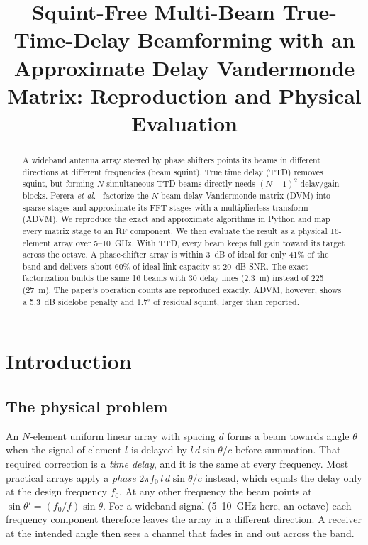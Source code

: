 \documentclass[conference]{IEEEtran}
\begin{document}
\title{Squint-Free Multi-Beam True-Time-Delay Beamforming with an Approximate Delay Vandermonde Matrix: Reproduction and Physical Evaluation}

\author{
}

\maketitle

\begin{abstract}
A wideband antenna array steered by phase shifters points its beams in different directions at different frequencies (beam squint). True time delay (TTD) removes squint, but forming $N$ simultaneous TTD beams directly needs $(N-1)^2$ delay/gain blocks. Perera \emph{et al.}~\cite{perera2025} factorize the $N$-beam delay Vandermonde matrix (DVM) into sparse stages and approximate its FFT stages with a multiplierless transform (ADVM). We reproduce the exact and approximate algorithms in Python and map every matrix stage to an RF component. We then evaluate the result as a physical 16-element array over 5--10~GHz. With TTD, every beam keeps full gain toward its target across the octave. A phase-shifter array is within 3~dB of ideal for only 41\% of the band and delivers about 60\% of ideal link capacity at 20~dB SNR. The exact factorization builds the same 16 beams with 30 delay lines (2.3~m) instead of 225 (27~m). The paper's operation counts are reproduced exactly. ADVM, however, shows a 5.3~dB sidelobe penalty and $1.7^\circ$ of residual squint, larger than reported.
\end{abstract}

\section{Introduction}

\subsection{The physical problem}
An $N$-element uniform linear array with spacing $d$ forms a beam towards angle $\theta$ when the signal of element $l$ is delayed by $l\,d\sin\theta/c$ before summation. That required correction is a \emph{time delay}, and it is the same at every frequency. Most practical arrays apply a \emph{phase} $2\pi f_0\,l\,d\sin\theta/c$ instead, which equals the delay only at the design frequency $f_0$. At any other frequency the beam points at $\sin\theta' = (f_0/f)\sin\theta$. For a wideband signal (5--10~GHz here, an octave) each frequency component therefore leaves the array in a different direction. A receiver at the intended angle then sees a channel that fades in and out across the band.
\end{document}
